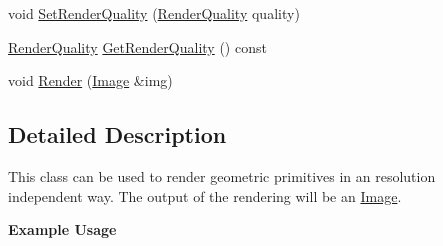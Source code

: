 \begin{DoxyCompactItemize}
\item 
void \hyperlink{classastu_1_1ImageRenderer_a154491f8ef39881eeaba56f9d8ca24e8}{Set\+Render\+Quality} (\hyperlink{group__gfx__group_gac3b4955f341cea44f53f8446d734cd54}{Render\+Quality} quality)
\item 
\hyperlink{group__gfx__group_gac3b4955f341cea44f53f8446d734cd54}{Render\+Quality} \hyperlink{classastu_1_1ImageRenderer_a7f3f1cc8129dd8e40dea73e7f1333769}{Get\+Render\+Quality} () const
\item 
void \hyperlink{classastu_1_1ImageRenderer_a55172edcac396d7840da655697d57e28}{Render} (\hyperlink{classastu_1_1Image}{Image} \&img)
\end{DoxyCompactItemize}


\subsection{Detailed Description}
This class can be used to render geometric primitives in an resolution independent way. The output of the rendering will be an \hyperlink{classastu_1_1Image}{Image}.

{\bfseries Example Usage}


